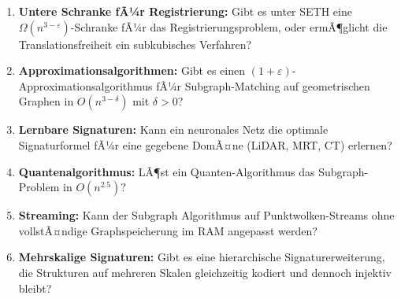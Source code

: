 ﻿\documentclass[a4paper,12pt]{article}
\theoremstyle{definition}
\begin{document}
\begin{enumerate}
  \item \textbf{Untere Schranke fÃ¼r Registrierung:} Gibt es unter
        SETH eine $\Omega(n^{3-\varepsilon})$-Schranke fÃ¼r das
        Registrierungsproblem, oder ermÃ¶glicht die Translationsfreiheit
        ein subkubisches Verfahren?
  \item \textbf{Approximationsalgorithmen:} Gibt es einen
        $(1+\varepsilon)$-Approximationsalgorithmus fÃ¼r Subgraph-Matching
        auf geometrischen Graphen in $O(n^{3-\delta})$ mit $\delta > 0$?
  \item \textbf{Lernbare Signaturen:} Kann ein neuronales Netz die
        optimale Signaturformel fÃ¼r eine gegebene DomÃ¤ne
        (LiDAR, MRT, CT) erlernen?
  \item \textbf{Quantenalgorithmus:} LÃ¶st ein Quanten-Algorithmus
        das Subgraph-Problem in $O(n^{2.5})$?
  \item \textbf{Streaming:} Kann der Subgraph Algorithmus auf
        Punktwolken-Streams ohne vollstÃ¤ndige Graphspeicherung
        im RAM angepasst werden?
  \item \textbf{Mehrskalige Signaturen:} Gibt es eine hierarchische
        Signaturerweiterung, die Strukturen auf mehreren Skalen
        gleichzeitig kodiert und dennoch injektiv bleibt?
\end{enumerate}
\end{document}
